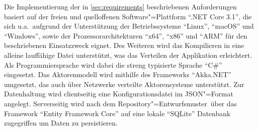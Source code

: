 Die Implementierung der in \autoref{sec:requirements} beschriebenen Anforderungen basiert auf der freien und quelloffenen Software"=Plattform \enquote{.NET Core 3.1}, die sich u.a.\ aufgrund der Unterstützung der Betriebssysteme \enquote{Linux}, \enquote{macOS} und \enquote{Windows}, sowie der Prozessorarchitekturen \enquote{x64}, \enquote{x86} und \enquote{ARM} für den beschriebenen Einsatzzweck eignet.
Des Weiteren wird das Kompilieren in eine alleine lauffähige Datei unterstützt, was das Verteilen der Applikation erleichtert.
Als Programmiersprache wird dabei die streng typisierte Sprache \enquote{C\#} eingesetzt.
Das Aktorenmodell wird mithilfe des Frameworks \enquote{Akka.NET} umgesetzt, das auch über Netzwerke verteilte Aktorensysteme unterstützt.
Zur Datenhaltung wird clientseitig eine Konfigurationsdatei im \ac{JSON}"=Format angelegt.
Serverseitig wird nach dem Repository"=Entwurfsmuster\unskip\ über das Framework \enquote{Entity Framework Core} auf eine lokale \enquote{SQLite} Datenbank zugegriffen um Daten zu persistieren.
